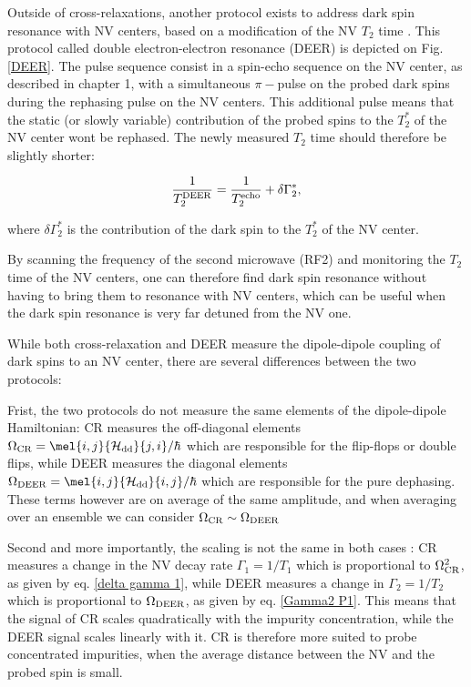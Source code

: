 \documentclass[a4paper,11pt]{report}
\begin{document}
\begin{refsection}
Outside of cross-relaxations, another protocol exists to address dark spin resonance with NV centers, based on a modification of the NV $T_2$ time \citep{serbyn2014interferometric}. This protocol called double electron-electron resonance (DEER) is depicted on Fig. \ref{DEER}. The pulse sequence consist in a spin-echo sequence on the NV center, as described in chapter 1, with a simultaneous $\pi-$pulse on the probed dark spins during the rephasing pulse on the NV centers. This additional pulse means that the static (or slowly variable) contribution of the probed spins to the $T_2^*$ of the NV center wont be rephased. The newly measured $T_2$ time should therefore be slightly shorter:

\begin{equation}
\frac{1}{T_2^{\rm DEER}}=\frac{1}{T_2^{\rm echo}} + \delta \Gamma_2^*,
\end{equation}

where $\delta \Gamma_2^*$ is the contribution of the dark spin to the $T_2^*$ of the NV center.

By scanning the frequency of the second microwave (RF2) and monitoring the $T_2$ time of the NV centers, one can therefore find dark spin resonance without having to bring them to resonance with NV centers, which can be useful when the dark spin resonance is very far detuned from the NV one.

While both cross-relaxation and DEER measure the dipole-dipole coupling of dark spins to an NV center, there are several differences between the two protocols:

Frist, the two protocols do not measure the same elements of the dipole-dipole Hamiltonian: CR measures the off-diagonal elements $\Omega_{\rm CR}=\mel{i,j}{\mathcal{H}_{\rm dd}}{j,i}/\hbar$ which are responsible for the flip-flops or double flips, while DEER measures the diagonal elements $\Omega_{\rm DEER}=\mel{i,j}{\mathcal{H}_{\rm dd}}{i,j}/\hbar$ which are responsible for the pure dephasing. These terms however are on average of the same amplitude, and when averaging over an ensemble we can consider $\Omega_{\rm CR} \sim \Omega_{\rm DEER}$

Second and more importantly, the scaling is not the same in both cases : CR measures a change in the NV decay rate $\Gamma_1=1/T_1$ which is proportional to $\Omega_{\rm CR}^2$, as given by eq. \ref{delta gamma 1}, while DEER measures a change in $\Gamma_2=1/T_2$ which is proportional to $\Omega_{\rm DEER}$, as given by eq. \ref{Gamma2 P1}. This means that the signal of CR scales quadratically with the impurity concentration, while the DEER signal scales linearly with it. CR is therefore more suited to probe concentrated impurities, when the average distance between the NV and the probed spin is small.


\end{refsection}
\end{document}
